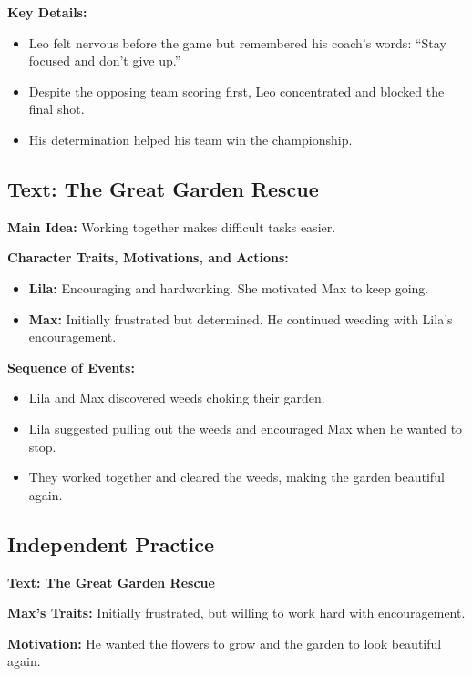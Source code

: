 \documentclass[12pt]{article}
\begin{document}
\textbf{Key Details:}
\begin{itemize}
    \item Leo felt nervous before the game but remembered his coach's words: “Stay focused and don’t give up.”
    \item Despite the opposing team scoring first, Leo concentrated and blocked the final shot.
    \item His determination helped his team win the championship.
\end{itemize}

\vspace{1em}

\subsection*{Text: The Great Garden Rescue}

\textbf{Main Idea:} Working together makes difficult tasks easier.

\textbf{Character Traits, Motivations, and Actions:}
\begin{itemize}
    \item \textbf{Lila:} Encouraging and hardworking. She motivated Max to keep going.
    \item \textbf{Max:} Initially frustrated but determined. He continued weeding with Lila’s encouragement.
\end{itemize}

\textbf{Sequence of Events:}
\begin{itemize}
    \item Lila and Max discovered weeds choking their garden.
    \item Lila suggested pulling out the weeds and encouraged Max when he wanted to stop.
    \item They worked together and cleared the weeds, making the garden beautiful again.
\end{itemize}

\vspace{1em}

\subsection*{Independent Practice}

\textbf{Text: The Great Garden Rescue}

\textbf{Max’s Traits:} Initially frustrated, but willing to work hard with encouragement.

\textbf{Motivation:} He wanted the flowers to grow and the garden to look beautiful again.
\end{document}
